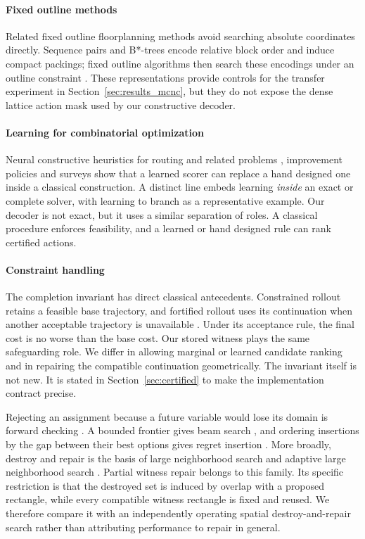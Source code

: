 \documentclass[preprint,12pt,authoryear]{elsarticle}
\begin{document}
\paragraph{Fixed outline methods}
Related fixed outline floorplanning methods avoid searching absolute coordinates
directly. Sequence pairs \citep{Murata1996SequencePair} and B*-trees
\citep{Chang2000BStar} encode relative block order and induce compact packings;
fixed outline algorithms then search these encodings under an outline constraint
\citep{Adya2003FixedOutline}. These representations provide controls for
the transfer experiment in Section~\ref{sec:results_mcnc}, but they do
not expose the dense lattice action mask used by our constructive decoder.

\paragraph{Learning for combinatorial optimization}
Neural constructive heuristics for routing and related problems
\citep{Bello2017NCO,Kool2019Attention}, improvement policies
\citep{Wu2021Improvement} and surveys \citep{Bengio2021Horizon,Mazyavkina2021RLCO}
show that a learned scorer can replace a hand designed one inside a
classical construction. A distinct line embeds
learning \emph{inside} an exact or complete solver, with learning to branch
\citep{Gasse2019Branch} as a representative example. Our decoder is not exact,
but it uses a similar separation of roles. A classical procedure enforces
feasibility, and a learned or hand designed rule can rank certified actions.

\paragraph{Constraint handling}
The completion invariant has direct classical antecedents. Constrained rollout
retains a feasible base trajectory, and fortified rollout uses its continuation
when another acceptable trajectory is unavailable
\citep{Bertsekas2005Constrained,Bertsekas2020Constrained}. Under its acceptance
rule, the final cost is no worse than the base cost. Our stored witness plays the
same safeguarding role. We differ in allowing marginal or learned candidate
ranking and in repairing the compatible continuation geometrically. The
invariant itself is not new. It is stated in Section~\ref{sec:certified} to make
the implementation contract precise.

Rejecting an assignment because a future variable would lose its domain is
forward checking \citep{Haralick1980}. A bounded frontier gives beam search
\citep{Ow1988Beam}, and ordering insertions by the gap between their best options
gives regret insertion \citep{Potvin1993Regret}. More broadly, destroy and repair
is the basis of large neighborhood search and adaptive large neighborhood search
\citep{Ropke2006ALNS}. Partial witness repair belongs to this family. Its specific
restriction is that the destroyed set is induced by overlap with a proposed
rectangle, while every compatible witness rectangle is fixed and reused. We
therefore compare it with an independently operating spatial destroy-and-repair
search rather than attributing performance to repair in general.
\end{document}
